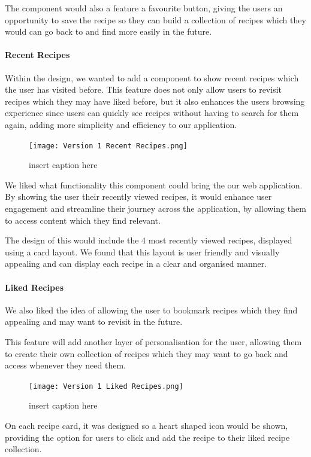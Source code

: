 \documentclass{article}
\begin{document}
The component would also a feature a favourite button, giving the users an opportunity to save the recipe so they can build a collection of recipes which they would can go back to and find more easily in the future. 

\paragraph{Recent Recipes}  
Within the design, we wanted to add a component to show recent recipes which the user has visited before. This feature does not only allow users to revisit recipes which they may have liked before, but it also enhances the users browsing experience since users can quickly see recipes without having to search for them again, adding more simplicity and efficiency to our application.

\begin{figure}[htbp]
  \texttt{[image: Version 1 Recent Recipes.png]}
  \centering
  \caption{insert caption here}
\end{figure}

We liked what functionality this component could bring the our web application. By showing the user their recently viewed recipes, it would enhance user engagement and streamline their journey across the application, by allowing them to access content which they find relevant.

The design of this would include the 4 most recently viewed recipes, displayed using a card layout. We found that this layout is user friendly and visually appealing and can display each recipe in a clear and organised manner. 

\paragraph{Liked Recipes}
We also liked the idea of allowing the user to bookmark recipes which they find appealing and may want to revisit in the future. 

This feature will add another layer of personalisation for the user, allowing them to create their own collection of recipes which they may want to go back and access whenever they need them. 

\begin{figure}[htbp]
  \texttt{[image: Version 1 Liked Recipes.png]}
  \centering
  \caption{insert caption here}
\end{figure}


On each recipe card, it was designed so a heart shaped icon would be shown, providing the option for users to click and add the recipe to their liked recipe collection. 
\end{document}
